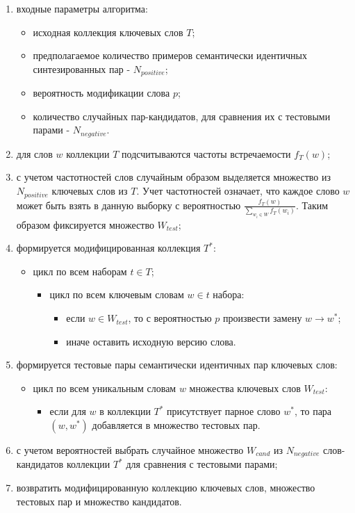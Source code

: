 \begin{enumerate}
    \item входные параметры алгоритма:
        \begin{itemize} 
            \item исходная коллекция ключевых слов $T$;
            \item предполагаемое количество примеров семантически идентичных синтезированных пар - $N_{positive}$;
            \item вероятность модификации слова $p$;
            \item количество случайных пар-кандидатов, для сравнения их с тестовыми парами - $N_{negative}$.
        \end{itemize}
    \item для слов $w$ коллекции $T$ подсчитываются частоты встречаемости $f_T(w)$;
    \item с учетом частотностей слов случайным образом выделяется множество из $N_{positive}$ ключевых слов из $T$. Учет частотностей означает, что каждое слово $w$ может быть взять в данную выборку с вероятностью $\frac{f_T(w)}{\sum_{w_i \in W} f_T(w_i)}$. Таким образом фиксируется множество $W_{test}$;
    \item формируется модифицированная коллекция $T^*$:
        \begin{itemize}
            \item цикл по всем наборам $t \in T$;
                \begin{itemize}
                    \item цикл по всем ключевым словам $w \in t$ набора:
                        \begin{itemize}
                            \item если $w \in W_{test}$, то с вероятностью $p$ произвести замену $w \rightarrow w^*$;
                            \item иначе оставить исходную версию слова.
                        \end{itemize}
                \end{itemize}
        \end{itemize}
    \item формируется тестовые пары семантически идентичных пар ключевых слов:
        \begin{itemize}
            \item цикл по всем уникальным словам $w$ множества ключевых слов $W_{test}$:
                \begin{itemize}
                    \item если для $w$ в коллекции $T^*$ присутствует парное слово $w^*$, то пара $(w, w^*)$ добавляется в множество тестовых пар. 
                \end{itemize}
        \end{itemize}
    \item с учетом вероятностей выбрать случайное множество $W_{cand}$ из $N_{negative}$ слов-кандидатов коллекции $T^*$ для сравнения с тестовыми парами;
    \item возвратить модифицированную коллекцию ключевых слов, множество тестовых пар и множество кандидатов.
\end{enumerate}

